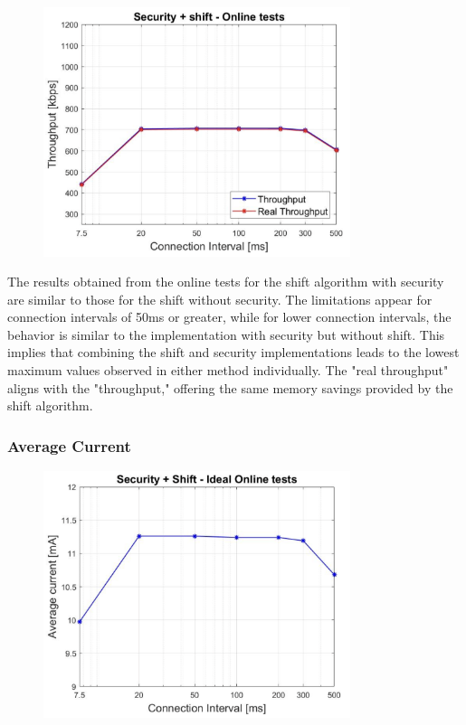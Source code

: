 \documentclass{Configuration_Files/PoliMi3i_thesis}
\begin{document}
\begin{figure}[h!]
    \centering
    \includegraphics[width=0.8\textwidth]{Results Manuel/figure23}
    \label{fig:figure1}
\end{figure}

The results obtained from the online tests for the shift algorithm with security are similar to those for the shift without security. The limitations appear for connection intervals of 50ms or greater, while for lower connection intervals, the behavior is similar to the implementation with security but without shift. This implies that combining the shift and security implementations leads to the lowest maximum values observed in either method individually. The "real throughput" aligns with the "throughput," offering the same memory savings provided by the shift algorithm.

\subsubsection*{Average Current}

\begin{figure}[h!]
    \centering
    \includegraphics[width=0.8\textwidth]{Results Manuel/figure24}
    \label{fig:figure1}
\end{figure}
\end{document}
